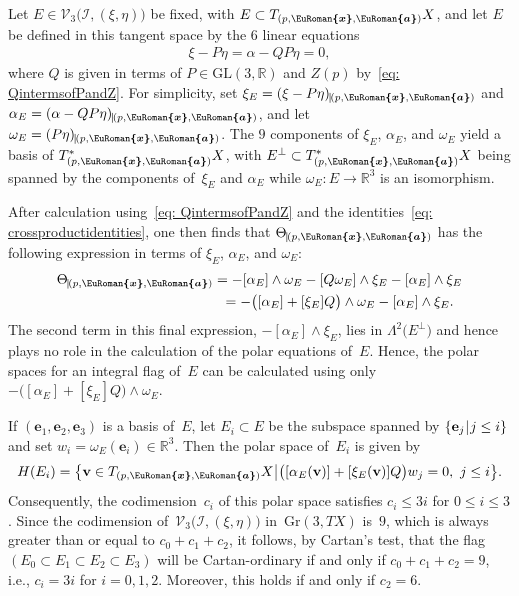 \documentclass[pdftex]{sigma}
\numberwithin{equation}{section}
\newcommand{\eurom}{\EuRoman}
\newcommand{\cI}{{\mathcal I}}
\newcommand{\cV}{{\mathcal V}}
\newcommand{\bbR}{{\mathbb R}}
\newcommand{\mbe}{\mathbf{e}}
\newcommand{\mbv}{\mathbf{v}}
\newcommand{\euroa}{\bm{\eurom{a}}}
\newcommand{\eurox}{\bm{\eurom{x}}}
\begin{document}
Let $E\in\cV_3\bigl(\cI,(\xi,\eta)\bigr)$ be fixed, with $E\subset T_{(p,\eurox,\euroa)}X$, and let $E$ be defined in this tangent space by the $6$ linear equations
\begin{gather}\label{eq: E in PQterms}
\xi - P \eta = \alpha - QP \eta = 0,
\end{gather}
where $Q$ is given in terms of $P\in\mathrm{GL}(3,\mathbb{R})$ and $Z(p)$ by~\eqref{eq: QintermsofPandZ}. For simplicity, set $\xi_E = (\xi - P \eta)_{\vrule(p,\eurox,\euroa)}$
and $\alpha_E = (\alpha - QP \eta)_{\vrule(p,\eurox,\euroa)}$, and let $\omega_E = (P \eta)_{\vrule(p,\eurox,\euroa)}$. The $9$ components of $\xi_E$, $\alpha_E$, and $\omega_E$ yield a basis of $T^*_{(p,\eurox,\euroa)}X$, with $E^\perp\subset T^*_{(p,\eurox,\euroa)}X$ being spanned by the components of~$\xi_E$ and $\alpha_E$ while $\omega_E\colon E\to\bbR^3$ is an isomorphism.

After calculation using~\eqref{eq: QintermsofPandZ} and the identities~\eqref{eq: crossproductidentities}, one then finds that $\Theta_{\vrule(p,\eurox,\euroa)}$ has the following expression in terms of $\xi_E$, $\alpha_E$, and $\omega_E$:
\begin{gather*}
\Theta_{\vrule(p,\eurox,\euroa)} = - [\alpha_E ]\wedge \omega_E
- [Q \omega_E ]\wedge \xi_E - [\alpha_E ]\wedge \xi_E\\
\hphantom{\Theta_{\vrule(p,\eurox,\euroa)}}{} =-\bigl( [\alpha_E ]+ [\xi_E ]Q\big)\wedge\omega_E
 - \left[\alpha_E\right]\wedge \xi_E .
\end{gather*}
The second term in this final expression, $- [\alpha_E ]\wedge \xi_E$, lies in $\Lambda^2\big(E^\perp\big)$ and hence plays no role in the calculation of the polar equations of~$E$. Hence, the polar spaces for an integral flag of~$E$ can be calculated using only $-\bigl( [\alpha_E ]+ [\xi_E ]Q\big)\wedge\omega_E$.

If $(\mbe_1,\mbe_2,\mbe_3)$ is a basis of~$E$, let $E_i\subset E$ be the subspace spanned by $\{ \mbe_j\, \vrule \, j\le i \}$ and set $w_i = \omega_E(\mbe_i)\in\bbR^3$.
Then the polar space of~$E_i$ is given by
\begin{gather*}
H(E_i) = \big\{\mbv\in T_{(p,\eurox,\euroa)}X\, \vrule\, \big( [\alpha_E(\mbv) ]+ [\xi_E(\mbv) ]Q\big)w_j =0, \ j\le i\big\}.
\end{gather*}
Consequently, the codimension~$c_i$ of this polar space
satisfies $c_i \le 3i$ for $0\le i\le 3$. Since the codimension
of~$\cV_3\bigl(\cI,(\xi,\eta)\bigr)$ in~$\mathrm{Gr}(3,TX)$ is~$9$,
which is always greater than or equal to $c_0 + c_1 + c_2$,
it follows, by Cartan's test, that the flag
$(E_0\subset E_1\subset E_2\subset E_3)$
will be Cartan-ordinary if and only if $c_0+c_1+c_2=9$,
i.e., $c_i = 3i$ for $i = 0,1,2$.
Moreover, this holds if and only if $c_2 = 6$.
\end{document}

